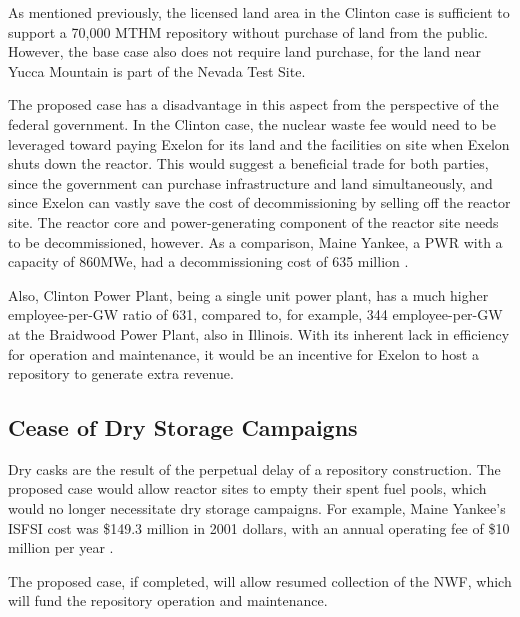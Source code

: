 
  
  As mentioned previously, the licensed land area in the Clinton case is 
  sufficient to support a 70,000 MTHM repository without purchase of land from 
  the public.  However, the base case also does not require land purchase, for the land near 
  Yucca Mountain is part of the Nevada Test Site. 
  
  The proposed case has a disadvantage in this aspect from the perspective of 
  the federal government. In the Clinton case, the nuclear waste fee would need 
  to be leveraged toward paying Exelon for its land and the facilities on site 
  when Exelon shuts down the reactor.
  This would suggest a beneficial trade for both parties, since the government
  can purchase infrastructure and land simultaneously, and since Exelon can vastly
  save the cost of decommissioning by selling off the reactor site. The reactor
  core and power-generating component of the reactor site needs to be decommissioned,
  however. As a comparison, Maine Yankee, a PWR with a capacity of 860MWe, had a
  decommissioning cost of 635 million \cite{Maine_Yankee}.


Also, Clinton Power Plant, being a single unit power plant, has a much higher
 employee-per-GW ratio of 631, compared to, for example, 344 employee-per-GW at
the Braidwood Power Plant, also in Illinois. %
With its inherent lack in efficiency for operation and maintenance, it would be
an incentive for Exelon to host a repository to generate extra revenue. 

 
\subsection{Cease of Dry Storage Campaigns}

Dry casks are the result of the perpetual delay of a repository construction.
The proposed case would allow reactor sites to empty their spent fuel pools, which
would no longer necessitate dry storage campaigns. For example, Maine Yankee's 
\gls{ISFSI} cost was \$149.3 million in 2001 dollars, with an annual operating fee
of \$10 million per year \cite{IAEA_2009}. 

The proposed case, if completed, will allow resumed collection of the \gls{NWF}, 
which will fund the repository operation and maintenance.

